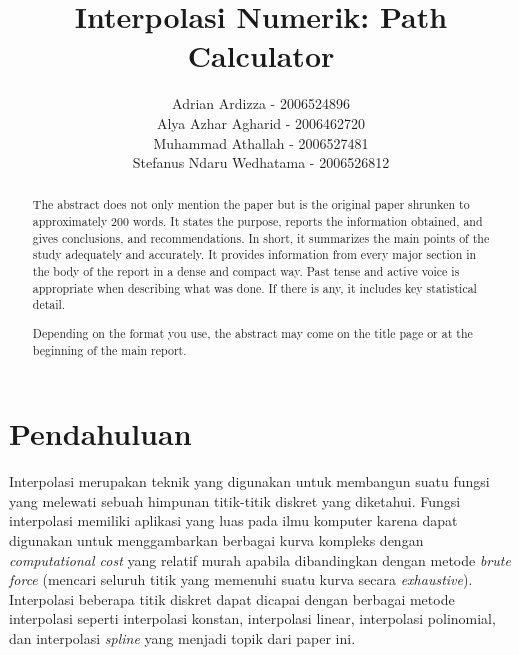 \documentclass[journal,12pt,onecolumn,a4paper]{IEEEtran}
\begin{document}
\begin{titlepage}
	\title{Interpolasi Numerik: Path Calculator}



	\author{Adrian Ardizza - 2006524896\\
		Alya Azhar Agharid - 2006462720\\
		Muhammad Athallah - 2006527481\\
		Stefanus Ndaru Wedhatama - 2006526812
	}

	\maketitle
	\begin{abstract}
		The abstract does not only mention the paper but is the original paper shrunken to approximately 200 words. It states the purpose, reports the information obtained, and gives conclusions, and recommendations. In short, it summarizes the main points of the study adequately and accurately. It provides information from every major section in the body of the report in a dense and compact way. Past tense and active voice is appropriate when describing what was done. If there is any, it includes key statistical detail.

		Depending on the format you use, the abstract may come on the title page or at the beginning of the main report.

	\end{abstract}
	\tableofcontents
	\listoffigures
	\listoftables
\end{titlepage}

\IEEEpeerreviewmaketitle

\section{Pendahuluan}
Interpolasi merupakan teknik yang digunakan untuk membangun suatu fungsi yang melewati sebuah himpunan titik-titik diskret yang diketahui. Fungsi interpolasi memiliki aplikasi yang luas pada ilmu komputer karena dapat digunakan untuk menggambarkan berbagai kurva kompleks dengan \emph{computational cost} yang relatif murah apabila dibandingkan dengan metode \emph{brute force} (mencari seluruh titik yang memenuhi suatu kurva secara \emph{exhaustive}). Interpolasi beberapa titik diskret dapat dicapai dengan berbagai metode interpolasi seperti interpolasi konstan, interpolasi linear, interpolasi polinomial, dan interpolasi \emph{spline} yang menjadi topik dari paper ini.
\end{document}
